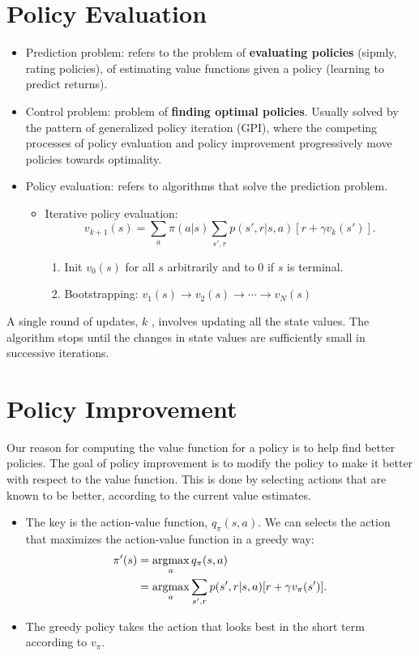 \section{Policy Evaluation}
\begin{itemize}
	\item Prediction problem: refers to the problem of \textbf{evaluating policies} (sipmly, rating policies), of estimating value functions given a policy (learning to predict returns).
	\item Control problem: problem of \textbf{finding optimal policies}. Usually solved by the pattern of generalized policy iteration (GPI), where the competing processes of policy evaluation and policy improvement progressively move policies towards optimality.
	\item Policy evaluation: refers to algorithms that solve the prediction problem.
		\begin{itemize}
			\item Iterative policy evaluation:
				$$v_{k+1}(s)=\sum_{a}\pi(a|s)\sum_{s',r}p(s',r|s,a)[r + \gamma v_k(s')].$$ 
				\begin{enumerate}
					\item Init $v_0(s)$ for all $s$ arbitrarily and to 0 if $s$ is terminal. 
					\item Bootstrapping: $v_1(s)\to v_2(s)\to\cdots\to v_N(s)$
				\end{enumerate}
		\end{itemize}
\end{itemize}

A single round of updates, $k$ , involves updating all the state values. The algorithm stops until 
the changes in state values are sufficiently small in successive iterations.

\section{Policy Improvement}
Our reason for computing the value function for a policy is to help find better policies. The goal of policy improvement is to modify the policy to make it better with respect to the value function. This is done by selecting actions that are known to be better, according to the current value estimates.

\begin{itemize}
	\item The key is the action-value function, $q_\pi(s,a)$. We can selects the action that maximizes the action-value function in a greedy way: 
		\begin{align*}
			\pi'(s) &= \operatorname*{\operatorname{argmax}}_a q_\pi(s,a)\\
			&= \operatorname*{\operatorname{argmax}}_a \sum_{s',r}p(s',r|s,a)[r + \gamma v_\pi(s')].
		\end{align*}
	\item The greedy policy takes the action that looks best in the short term according to $v_\pi$.
\end{itemize}

